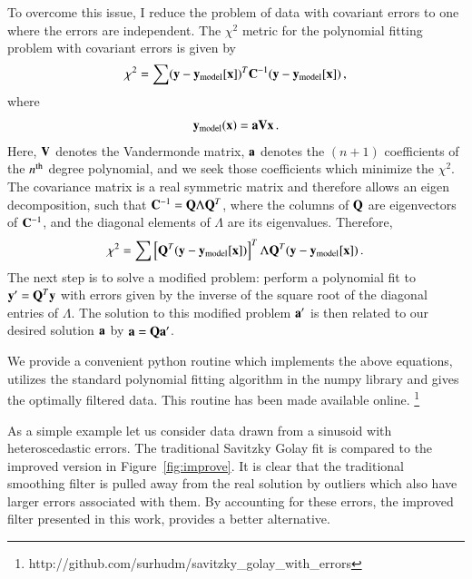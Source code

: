 \documentclass[iop, apj, onecolumn]{emulateapj}
\begin{document}
To overcome this issue, I reduce the problem of data with covariant errors to
one where the errors are independent. The $\chi^2$ metric for the polynomial
fitting problem with covariant errors is given by
\begin{equation}
        \chi^2 = \sum ({\bf y}-{\bf y}_{\rm model}[{\bf x}])^T {\bf C}^{-1}
        ({\bf y}-{\bf y}_{\rm model}[{\bf x}])\,,
\end{equation}
where
\begin{equation} 
        {\bf y}_{\rm model}({\bf x}) = {\bf a} {\bf V} {\bf x}\,.
\end{equation}
Here, ${\bf V}$ denotes the Vandermonde matrix, ${\bf a}$ denotes the $(n+1)$
coefficients of the $n^{\rm th}$ degree polynomial, and we seek those
coefficients which minimize the $\chi^2$.  The covariance matrix is a real
symmetric matrix and therefore allows an eigen decomposition, such that ${\bf
C}^{-1} = {\bf Q} \Lambda {\bf Q}^T$, where the columns of ${\bf Q}$ are
eigenvectors of ${\bf C}^{-1}$, and the diagonal elements of $\Lambda$ are its
eigenvalues. Therefore,
\begin{equation}
\chi^2 = \sum \left[{\bf Q}^T({\bf y}-{\bf y}_{\rm model}[{\bf x}])\right]^T
\Lambda {\bf Q}^T({\bf y}-{\bf y}_{\rm model}[{\bf x}])\,.
\end{equation}
The next step is to solve a modified problem: perform a polynomial fit to ${\bf
y'}={\bf Q}^T{\bf y}$ with errors given by the inverse of the square root of the
diagonal entries of $\Lambda$. The solution to this modified problem ${\bf a'}$
is then related to our desired solution ${\bf a}$ by ${\bf a}={\bf Q}{\bf a'}$.

We provide a convenient python routine which implements the above equations,
utilizes the standard polynomial fitting algorithm in the numpy library and
gives the optimally filtered data. This routine has been made available online.
\footnote{http://github.com/surhudm/savitzky\_golay\_with\_errors}

As a simple example let us consider data drawn from a sinusoid with
heteroscedastic errors. The traditional Savitzky Golay fit is compared to the
improved version in Figure~\ref{fig:improve}. It is clear that the traditional
smoothing filter is pulled away from the real solution by outliers which also
have larger errors associated with them. By accounting for these errors, the
improved filter presented in this work, provides a better alternative.
\end{document}
